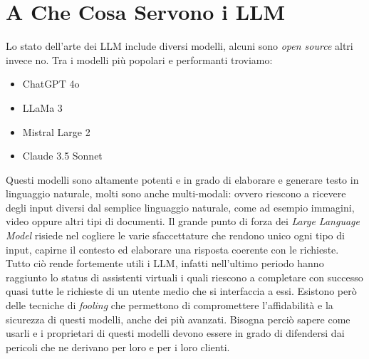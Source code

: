 \section{A Che Cosa Servono i LLM}
Lo stato dell'arte dei LLM include diversi modelli, alcuni sono \emph{open source} altri invece no.
Tra i modelli pi\`u popolari e performanti troviamo:
\begin{itemize}
    \item ChatGPT 4o \cite{openaihellogpt4o}
    \item LLaMa 3 \cite{dubey2024llama3herdmodels}
    \item Mistral Large 2 \cite{mistralaimistrallarge2}
    \item Claude 3.5 Sonnet \cite{anthropicclaude35sonnet}
\end{itemize}
Questi modelli sono altamente potenti e in grado di elaborare e generare testo in linguaggio naturale, molti sono anche multi-modali: ovvero riescono a ricevere degli input diversi dal semplice linguaggio naturale, come ad esempio immagini, video oppure altri tipi di documenti.
Il grande punto di forza dei \emph{Large Language Model} risiede nel cogliere le varie sfaccettature che rendono unico ogni tipo di input, capirne il contesto ed elaborare una risposta coerente con le richieste.
Tutto ci\`o rende fortemente utili i LLM, infatti nell'ultimo periodo hanno raggiunto lo status di assistenti virtuali i quali riescono a completare con successo quasi tutte le richieste di un utente medio che si interfaccia a essi. Esistono per\`o delle tecniche di \emph{fooling} che permettono di compromettere l'affidabilit\`a e la sicurezza di questi modelli, anche dei pi\`u avanzati. Bisogna perci\`o sapere come usarli e i proprietari di questi modelli devono essere in grado di difendersi dai pericoli che ne derivano per loro e per i loro clienti.
